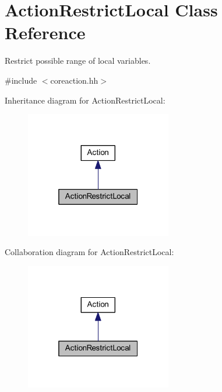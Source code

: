 \hypertarget{class_action_restrict_local}{}\section{Action\+Restrict\+Local Class Reference}
\label{class_action_restrict_local}


Restrict possible range of local variables.  




{\ttfamily \#include $<$coreaction.\+hh$>$}



Inheritance diagram for Action\+Restrict\+Local\+:
\nopagebreak
\begin{figure}[H]
\begin{center}
\leavevmode
\includegraphics[width=181pt]{class_action_restrict_local__inherit__graph}
\end{center}
\end{figure}


Collaboration diagram for Action\+Restrict\+Local\+:
\nopagebreak
\begin{figure}[H]
\begin{center}
\leavevmode
\includegraphics[width=181pt]{class_action_restrict_local__coll__graph}
\end{center}
\end{figure}
